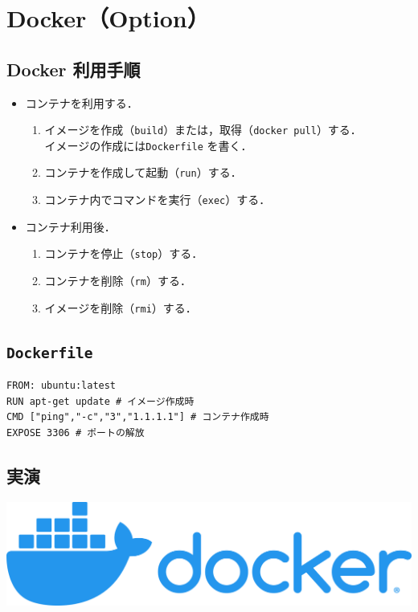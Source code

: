 \section{Docker（Option）}\label{chap:docker}
\tocc
\subsection{Docker 利用手順}
\begin{frame}[t]{\ftitle}
    \begin{itemize}
        \setlength{\itemsep}{1em}
        \item コンテナを利用する．
              \begin{enumerate}
                  \setlength{\itemsep}{.5em}
                  \item イメージを作成（\texttt{build}）または，取得（\texttt{docker pull}）する．\\
                        イメージの作成には\texttt{Dockerfile} を書く．
                  \item コンテナを作成して起動（\texttt{run}）する．
                  \item コンテナ内でコマンドを実行（\texttt{exec}）する．
              \end{enumerate}
        \item コンテナ利用後．
              \begin{enumerate}
                  \setlength{\itemsep}{.5em}
                  \item コンテナを停止（\texttt{stop}）する．
                  \item コンテナを削除（\texttt{rm}）する．
                  \item イメージを削除（\texttt{rmi}）する．
              \end{enumerate}
    \end{itemize}
\end{frame}
\subsection{\texttt{Dockerfile}}
\begin{frame}[containsverbatim,t]{\ftitle}
    \begin{lstlisting}[language=docker-compose-2]
FROM: ubuntu:latest
RUN apt-get update # イメージ作成時
CMD ["ping","-c","3","1.1.1.1"] # コンテナ作成時
EXPOSE 3306 # ポートの解放
\end{lstlisting}
\end{frame}
\subsection{実演}
\begin{frame}{\ftitle}
    \includegraphics[keepaspectratio,width=\textwidth]{docker_logo.png}\\\vspace{1em}
    \hfill\cite{docker}
\end{frame}